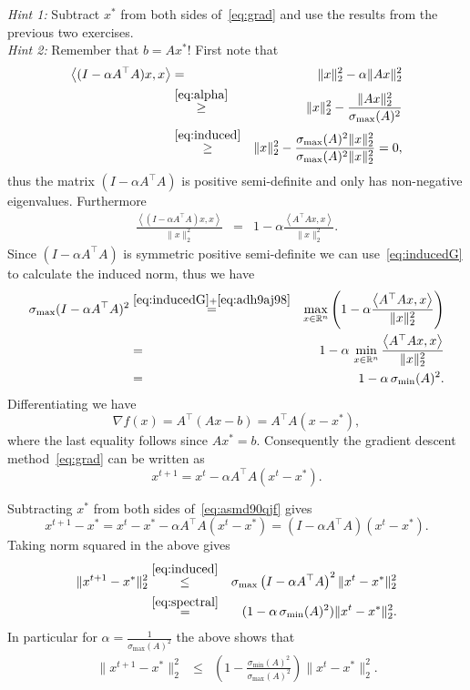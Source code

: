 \documentclass[11pt]{article}
\newcommand{\R}{\mathbb{R}}
\newcommand{\norm}[1]{\lVert#1\rVert}
\newcommand{\dotprod}[1]{\left< #1\right>}
\begin{document}
\begin{ExerciseList}
  \ExeText \emph{Hint 1:} Subtract $x^*$ from both sides of~\eqref{eq:grad} and use the results from the previous two exercises.\\
    \ExeText \emph{Hint 2:} Remember that $b = A x^*$!
   \Answer[ref={I}]
    First note that 
     \begin{eqnarray*} 
     \dotprod{(I-\alpha  A^\top A)x,x} &=& \norm{x}_2^2 - \alpha \norm{Ax}_2^2 \\
     &\overset{\eqref{eq:alpha}}{\geq} & \norm{x}_2^2-\frac{\norm{Ax}_2^2 }{\sigma_{\max}(A)^2} \\
     & \overset{\eqref{eq:induced}}{\geq} & \norm{x}_2^2 - \frac{\sigma_{\max}(A)^2 \norm{x}_2^2}{\sigma_{\max}(A)^2\norm{x}_2^2} =0,
     \end{eqnarray*}
     thus the matrix $(I-\alpha  A^\top A)$ is positive semi-definite and only has non-negative eigenvalues.
Furthermore
     \begin{eqnarray} \label{eq:adh9aj98}
     \frac{\dotprod{(I-\alpha A^\top A)x, x}}{\norm{x}_2^2} & = &1 - \alpha \frac{\dotprod{A^\top A x,x}}{\norm{x}_2^2}.
     \end{eqnarray}
    Since $(I-\alpha  A^\top A)$ is symmetric positive semi-definite we can use~\eqref{eq:inducedG} to calculate the induced norm, thus we have 
     \begin{eqnarray*}
   \sigma_{\max}(I-\alpha A^\top A)^2 & \overset{\eqref{eq:inducedG}+\eqref{eq:adh9aj98}}{=} & \max_{x \in \R^n} \left(1 - \alpha \frac{\dotprod{A^\top A x,x}}{\norm{x}_2^2}\right)\\
     &= & 1 - \alpha\,\min_{x \in \R^n}  \frac{\dotprod{A^\top A x,x}}{\norm{x}_2^2} \\
     &= & 1- \alpha \,\sigma_{\min}(A)^2.
     \end{eqnarray*}
    \Answer[ref={II}] 
       Differentiating we have
    \[\nabla f(x) = A^\top (Ax -b) = A^\top A(x -x^*),\]
    where the last equality follows since $Ax^* =b.$
    Consequently the gradient descent method~\eqref{eq:grad} can be written as
 \begin{equation} \label{eq:asmd90qjf}x^{t+1} = x^t - \alpha  A^\top A(x^t -x^*).\end{equation}
    \Answer[ref={III}]    

    Subtracting $x^*$ from both sides of~\eqref{eq:asmd90qjf} gives
    \[ x^{t+1}-x^* = x^t -x^*- \alpha  A^\top A(x^t -x^*) = (I-\alpha  A^\top A)(x^t -x^*). \]
    Taking norm squared in the above gives 
  \begin{eqnarray*}
  \norm{x^{t+1} -x^*}_2^2 & \overset{\eqref{eq:induced}}{\leq} & \sigma_{\max}\left(I-\alpha  A^\top A\right)^2 \norm{x^t -x^*}_2^2 \\
& \overset{\eqref{eq:spectral}}{=} & (1- \alpha\, \sigma_{\min}(A)^2)  \norm{x^t -x^*}_2^2.
\end{eqnarray*}   
   In particular for $\alpha = \frac{1}{\sigma_{\max}(A)^2}$ the above shows that
  \begin{eqnarray*}
  \norm{x^{t+1} -x^*}_2^2 & \leq & \left(1- \frac{\sigma_{\min}(A)^2}{\sigma_{\max}(A)^2}\right)  \norm{x^t -x^*}_2^2.
\end{eqnarray*}
    

\end{ExerciseList}
\end{document}
